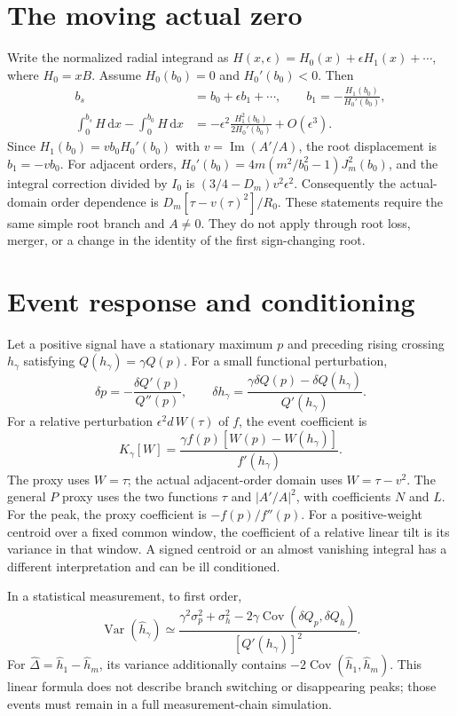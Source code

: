\documentclass[11pt,a4paper]{article}
\begin{document}
\section{The moving actual zero}
Write the normalized radial integrand as
$H(x,\epsilon)=H_0(x)+\epsilon H_1(x)+\cdots$, where $H_0=xB$.
Assume $H_0(b_0)=0$ and $H_0'(b_0)<0$. Then
\begin{align}
b_s&=b_0+\epsilon b_1+\cdots,\qquad
b_1=-\frac{H_1(b_0)}{H_0'(b_0)},\\
\int_0^{b_s}H\,\mathrm{d}x-\int_0^{b_0}H\,\mathrm{d}x
&=-\epsilon^2\frac{H_1^2(b_0)}{2H_0'(b_0)}+O(\epsilon^3).
\end{align}
Since $H_1(b_0)=v b_0H_0'(b_0)$ with
$v=\operatorname{Im}(A'/A)$, the root displacement is $b_1=-v b_0$.
For adjacent orders,
$H_0'(b_0)=4m(m^2/b_0^2-1)J_m^2(b_0)$, and the integral correction
divided by $I_0$ is $(3/4-D_m)v^2\epsilon^2$.
Consequently the actual-domain order dependence is
$D_m[\tau-v(\tau)^2]/R_0$. These statements require the same simple root
branch and $A\ne0$. They do not apply through root loss, merger, or a
change in the identity of the first sign-changing root.

\section{Event response and conditioning}
Let a positive signal have a stationary maximum $p$ and preceding rising
crossing $h_\gamma$ satisfying $Q(h_\gamma)=\gamma Q(p)$.
For a small functional perturbation,
\begin{equation}
\delta p=-\frac{\delta Q'(p)}{Q''(p)},\qquad
\delta h_\gamma=\frac{\gamma\delta Q(p)-\delta Q(h_\gamma)}{Q'(h_\gamma)}.
\end{equation}
For a relative perturbation $\epsilon^2 d\,W(\tau)$ of $f$,
the event coefficient is
\begin{equation}
K_\gamma[W]=\frac{\gamma f(p)[W(p)-W(h_\gamma)]}{f'(h_\gamma)}.
\end{equation}
The proxy uses $W=\tau$; the actual adjacent-order domain uses
$W=\tau-v^2$. The general $P$ proxy uses the two functions
$\tau$ and $|A'/A|^2$, with coefficients $N$ and $L$.
For the peak, the proxy coefficient is $-f(p)/f''(p)$.
For a positive-weight centroid over a fixed common window, the coefficient
of a relative linear tilt is its variance in that window. A signed centroid
or an almost vanishing integral has a different interpretation and can be
ill conditioned.

In a statistical measurement, to first order,
\begin{equation}
\operatorname{Var}(\widehat h_\gamma)\simeq
\frac{\gamma^2\sigma_p^2+\sigma_h^2
-2\gamma\operatorname{Cov}(\delta Q_p,\delta Q_h)}{[Q'(h_\gamma)]^2}.
\end{equation}
For $\widehat\Delta=\widehat h_1-\widehat h_m$, its variance additionally
contains $-2\operatorname{Cov}(\widehat h_1,\widehat h_m)$.
This linear formula does not describe branch switching or disappearing
peaks; those events must remain in a full measurement-chain simulation.
\end{document}
